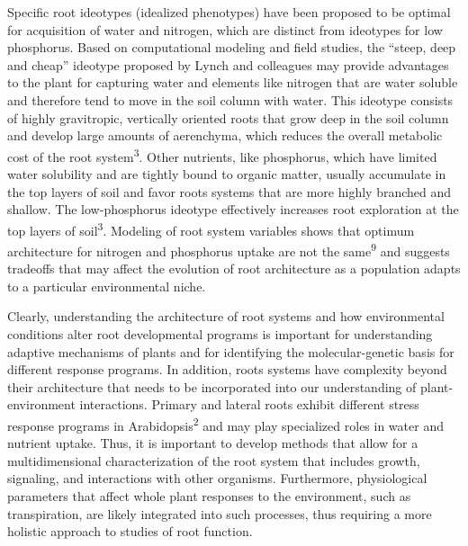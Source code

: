 \documentclass[]{article}
\begin{document}
Specific root ideotypes (idealized phenotypes) have been proposed to be
optimal for acquisition of water and nitrogen, which are distinct from
ideotypes for low phosphorus. Based on computational modeling and field
studies, the ``steep, deep and cheap'' ideotype proposed by Lynch and
colleagues may provide advantages to the plant for capturing water and
elements like nitrogen that are water soluble and therefore tend to move
in the soil column with water. This ideotype consists of highly
gravitropic, vertically oriented roots that grow deep in the soil column
and develop large amounts of aerenchyma, which reduces the overall
metabolic cost of the root system\textsuperscript{3}. Other nutrients,
like phosphorus, which have limited water solubility and are tightly
bound to organic matter, usually accumulate in the top layers of soil
and favor roots systems that are more highly branched and shallow. The
low-phosphorus ideotype effectively increases root exploration at the
top layers of soil\textsuperscript{3}. Modeling of root system variables
shows that optimum architecture for nitrogen and phosphorus uptake are
not the same\textsuperscript{9} and suggests tradeoffs that may affect
the evolution of root architecture as a population adapts to a
particular environmental niche.

Clearly, understanding the architecture of root systems and how
environmental conditions alter root developmental programs is important
for understanding adaptive mechanisms of plants and for identifying the
molecular-genetic basis for different response programs. In addition,
roots systems have complexity beyond their architecture that needs to be
incorporated into our understanding of plant-environment interactions.
Primary and lateral roots exhibit different stress response programs in
Arabidopsis\textsuperscript{2} and may play specialized roles in water
and nutrient uptake. Thus, it is important to develop methods that allow
for a multidimensional characterization of the root system that includes
growth, signaling, and interactions with other organisms. Furthermore,
physiological parameters that affect whole plant responses to the
environment, such as transpiration, are likely integrated into such
processes, thus requiring a more holistic approach to studies of root
function.
\end{document}
